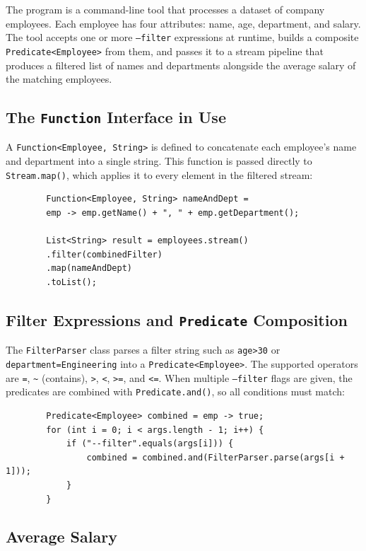 \documentclass[12pt, a4paper]{article}
\begin{document}
	The program is a command-line tool that processes a dataset of company
	employees. Each employee has four attributes: name, age, department, and salary.
	The tool accepts one or more \texttt{--filter} expressions at runtime, builds a
	composite \texttt{Predicate<Employee>} from them, and passes it to a stream
	pipeline that produces a filtered list of names and departments alongside the
	average salary of the matching employees.
	
	\subsection{The \texttt{Function} Interface in Use}
	
	A \texttt{Function<Employee, String>} is defined to concatenate each employee's
	name and department into a single string. This function is passed directly to
	\texttt{Stream.map()}, which applies it to every element in the filtered stream:
	
	\begin{lstlisting}
		Function<Employee, String> nameAndDept =
		emp -> emp.getName() + ", " + emp.getDepartment();
		
		List<String> result = employees.stream()
		.filter(combinedFilter)
		.map(nameAndDept)
		.toList();
	\end{lstlisting}
	
	\subsection{Filter Expressions and \texttt{Predicate} Composition}
	
	The \texttt{FilterParser} class parses a filter string such as \texttt{age>30}
	or \texttt{department=Engineering} into a \texttt{Predicate<Employee>}. The
	supported operators are \texttt{=}, \texttt{\textasciitilde} (contains),
	\texttt{>}, \texttt{<}, \texttt{>=}, and \texttt{<=}. When multiple
	\texttt{--filter} flags are given, the predicates are combined with
	\texttt{Predicate.and()}, so all conditions must match:
	
	\begin{lstlisting}
		Predicate<Employee> combined = emp -> true;
		for (int i = 0; i < args.length - 1; i++) {
			if ("--filter".equals(args[i])) {
				combined = combined.and(FilterParser.parse(args[i + 1]));
			}
		}
	\end{lstlisting}
	
	\subsection{Average Salary}
	
\end{document}
